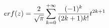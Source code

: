 \documentclass[preview]{standalone}
\begin{document}
\begin{align*}
erf(z) = { \frac{2}{\sqrt{\pi}} } \sum_{k=0}^{+\infty} { { (-1)^k } \over { ( {2k+1} ) {k!} } } {t^{2k+1}}
\end{align*}
\end{document}
